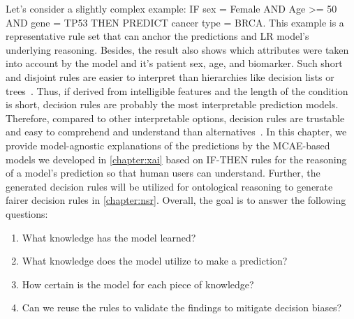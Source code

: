 \hspace*{3.5mm} Let's consider a slightly complex example: IF sex = Female AND Age >= 50 AND gene = TP53 THEN PREDICT cancer type = BRCA. This example is a representative rule set that can anchor the predictions and LR model's underlying reasoning. Besides, the result also shows which attributes were taken into account by the model and it's patient sex, age, and biomarker. Such short and disjoint rules are easier to interpret than hierarchies like decision lists or trees~\cite{ming2018rulematrix}.
Thus, if derived from intelligible features and the length of the condition is short, decision rules are probably the most interpretable prediction models. Therefore, compared to other interpretable options, decision rules are trustable and easy to comprehend and understand than alternatives~\cite{ribeiro2018anchors}. 
In this chapter, we provide model-agnostic explanations of the predictions by the MCAE-based models we developed in \cref{chapter:xai} based on IF-THEN rules for the reasoning of a model's prediction so that human users can understand. Further, the generated decision rules will be utilized for ontological reasoning to generate fairer decision rules in \cref{chapter:nsr}. Overall, the goal is to answer the following questions: 

\begin{enumerate}[noitemsep]
    \item What knowledge has the model learned?
    \item What knowledge does the model utilize to make a prediction?
    \item How certain is the model for each piece of knowledge? 
    \item Can we reuse the rules to validate the findings to mitigate decision biases? 
\end{enumerate}

